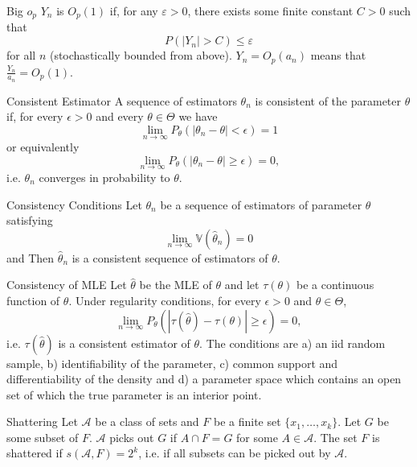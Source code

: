 \documentclass[avery5371,grid]{flashcards}
\begin{document}
\begin{flashcard}[Definition]{Big $o_p$}
$Y_n$ is $O_p(1)$ if, for any $\varepsilon > 0$, there exists some finite constant $C>0$ such that 
\[
P\left( |Y_n|  >  C \right) \le \varepsilon
\]
for all $n$ (stochastically bounded from above). $Y_n = O_p(a_n)$ means that $\frac{Y_n}{a_n} = O_p(1)$.
\end{flashcard}

\begin{flashcard}[Definition]{Consistent Estimator}
A sequence of estimators $\theta_n$ is consistent of the parameter $\theta$ if, for every $\epsilon > 0$ and every $\theta \in \Theta$ we have
\[
\lim_{n \to \infty} P_\theta\left(\left|\theta_n - \theta\right|<\epsilon\right) = 1
\] 
or equivalently 
\[
\lim_{n \to \infty} P_\theta\left(\left|\theta_n - \theta\right| \ge \epsilon\right) = 0,
\]
i.e. $\theta_n$ converges in probability to $\theta$.

\end{flashcard}

\begin{flashcard}[Theorem]{Consistency Conditions}
Let $\theta_n$ be a sequence of estimators of parameter $\theta$ satisfying
\[ \lim_{n \to \infty} \mathbb V\left(\hat \theta_n\right) = 0	\]
and 
Then $\hat \theta_n$ is a consistent sequence of estimators of $\theta$.
\end{flashcard}

\begin{flashcard}[Theorem]{Consistency of MLE}
\scriptsize
Let $\hat \theta$ be the MLE of $\theta$ and let $\tau(\theta)$ be a continuous function of $\theta$. Under regularity conditions, for every $\epsilon > 0$ and $\theta \in \Theta$,
\[
\lim_{n \to \infty} P_\theta \left(\left|\tau(\hat \theta) - \tau(\theta)\right| \ge \epsilon\right) = 0,
\]
i.e. $\tau(\hat \theta)$ is a consistent estimator of $\theta$. The conditions are a) an iid random sample, b) identifiability of the parameter, c) common support and differentiability
of the density and d) a parameter space which contains an open set of which the true parameter is an interior point.
\end{flashcard}

\begin{flashcard}[Definition]{Shattering}
Let $\mathcal{A}$ be a class of sets and $F$ be a finite set $\{x_1,\ldots,x_k\}$. Let $G$ be some subset of $F$. $\mathcal A$ picks out $G$ if $A \cap F = G$ for some 
$A \in \mathcal{A}$.
The set $F$ is shattered if $s(\mathcal{A},F) = 2^k$, i.e. if all subsets can be picked out by $\mathcal{A}$. 
\end{flashcard}
\end{document}
